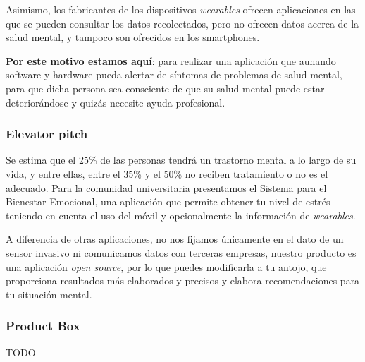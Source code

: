                 Asimismo, los fabricantes de los dispositivos \textit{wearables} ofrecen aplicaciones en las que se pueden consultar los datos recolectados, pero no ofrecen datos acerca de la salud mental, y tampoco son ofrecidos en los smartphones. 
                
                \textbf{Por este motivo estamos aquí}: para realizar una aplicación que aunando software y hardware pueda alertar de síntomas de problemas de salud mental, para que dicha persona sea consciente de que su salud mental puede estar deteriorándose y quizás necesite ayuda profesional.
                
            \subsubsection{Elevator pitch}
                Se estima que el 25\% de las personas tendrá un trastorno mental a lo largo de su vida, y entre ellas, entre el 35\% y el 50\% no reciben tratamiento o no es el adecuado. Para la comunidad universitaria presentamos el Sistema para el Bienestar Emocional, una aplicación que permite obtener tu nivel de estrés teniendo en cuenta el uso del móvil y opcionalmente la información de \textit{\textit{wearables}}. 
                
                A diferencia de otras aplicaciones, no nos fijamos únicamente en el dato de un sensor invasivo ni comunicamos datos con terceras empresas, nuestro producto es una aplicación \textit{open source}, por lo que puedes modificarla a tu antojo, que proporciona resultados más elaborados y precisos y elabora recomendaciones para tu situación mental.
                
            \subsubsection{Product Box}
                TODO
                
